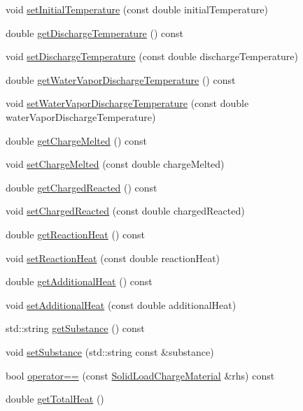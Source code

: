 \begin{DoxyCompactItemize}
void \hyperlink{class_solid_load_charge_material_ac80e565d26e68e542f4cb41f41b7d96c}{set\+Initial\+Temperature} (const double initial\+Temperature)
\item 
double \hyperlink{class_solid_load_charge_material_afcb8c00c2e23ad1444f34960b19835a0}{get\+Discharge\+Temperature} () const
\item 
void \hyperlink{class_solid_load_charge_material_adf73bc8d656a501cae5ad68af7a7c4fb}{set\+Discharge\+Temperature} (const double discharge\+Temperature)
\item 
double \hyperlink{class_solid_load_charge_material_a267f26d42f8ba2655c09f561fc0f6cb1}{get\+Water\+Vapor\+Discharge\+Temperature} () const
\item 
void \hyperlink{class_solid_load_charge_material_af7837868e494c16aba5a2c3e1220106d}{set\+Water\+Vapor\+Discharge\+Temperature} (const double water\+Vapor\+Discharge\+Temperature)
\item 
double \hyperlink{class_solid_load_charge_material_ad9ab52fe5861f48b763fe300851df69a}{get\+Charge\+Melted} () const
\item 
void \hyperlink{class_solid_load_charge_material_a9999a2976e8a8662a86cc2a159df5202}{set\+Charge\+Melted} (const double charge\+Melted)
\item 
double \hyperlink{class_solid_load_charge_material_a7c7f05b6ee14eb5f07e5c48c30e9c7a1}{get\+Charged\+Reacted} () const
\item 
void \hyperlink{class_solid_load_charge_material_a38f3b832ff29f779a78a51fd7352fcd4}{set\+Charged\+Reacted} (const double charged\+Reacted)
\item 
double \hyperlink{class_solid_load_charge_material_a3481dc84063babc3514a4173e6bd9341}{get\+Reaction\+Heat} () const
\item 
void \hyperlink{class_solid_load_charge_material_a9c3cd28b2b31fb66eea984d9030cd247}{set\+Reaction\+Heat} (const double reaction\+Heat)
\item 
double \hyperlink{class_solid_load_charge_material_a0fde17a84b10bb75bf78227548fbf26c}{get\+Additional\+Heat} () const
\item 
void \hyperlink{class_solid_load_charge_material_a849fd29a3ecb95be2e9d34f9280b1b94}{set\+Additional\+Heat} (const double additional\+Heat)
\item 
std\+::string \hyperlink{class_solid_load_charge_material_ade525be6bb8cb86405daeb61d45311f9}{get\+Substance} () const
\item 
void \hyperlink{class_solid_load_charge_material_aebe376ab016f48678c3a70390b4ea52a}{set\+Substance} (std\+::string const \&substance)
\item 
bool \hyperlink{class_solid_load_charge_material_aacf2f41ce38067a52fb7d8456a05a699}{operator==} (const \hyperlink{class_solid_load_charge_material}{Solid\+Load\+Charge\+Material} \&rhs) const
\item 
double \hyperlink{class_solid_load_charge_material_af8593eb758c64236a8a026d6145584f4}{get\+Total\+Heat} ()
\end{DoxyCompactItemize}
